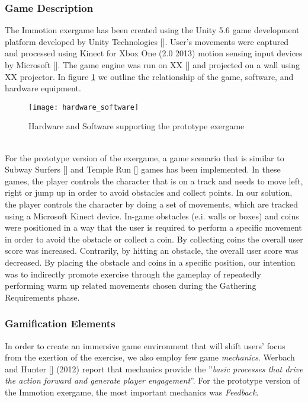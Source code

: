 \subsubsection{Game Description}
The Immotion exergame has been created using the Unity 5.6 game development platform developed by Unity Technologies []. User's movements were captured and processed using Kinect for Xbox One (2.0 2013) motion sensing input devices by Microsoft []. The game engine was run on XX [] and projected on a wall using XX projector. In figure \ref{fig:hs} we outline the relationship of the game, software, and hardware equipment.\\
\begin{figure}[h]
    \centering
    \texttt{[image: hardware\_software]}
    \caption{Hardware and Software supporting the prototype exergame}
    \label{fig:hs}
\end{figure}\\
For the prototype version of the exergame, a game scenario that is similar to Subway Surfers [] and Temple Run [] games has been implemented. In these games, the player controls the character that is on a track and needs to move left, right or jump up in order to avoid obstacles and collect points. In our solution, the player controls the character by doing a set of movements, which are tracked using a Microsoft Kinect device. In-game obstacles (e.i. walls or boxes) and coins were positioned in a way that the user is required to perform a specific movement in order to avoid the obstacle or collect a coin. By collecting coins the overall user score was increased. Contrarily, by hitting an obstacle, the overall user score was decreased. By placing the obstacle and coins in a specific position, our intention was to indirectly promote exercise through the gameplay of repeatedly performing warm up related movements chosen during the Gathering Requirements phase.

\subsubsection{Gamification Elements}
In order to create an immersive game environment that will shift users' focus from the exertion of the exercise, we also employ few game \textit{mechanics}.  Werbach and Hunter [] (2012) report that mechanics provide the ''\textit{basic processes that drive the action forward and generate
player engagement}''. For the prototype version of the Immotion exergame, the most important mechanics was \textit{Feedback}.

